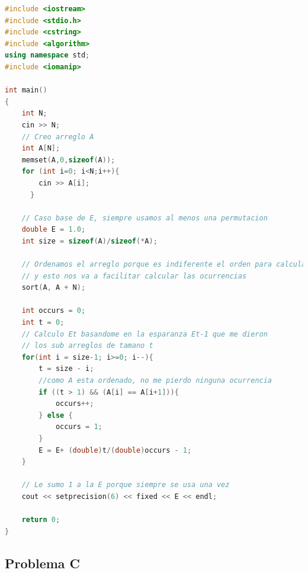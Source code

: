\documentclass[a4paper]{article}
\begin{document}
\begin{lstlisting}[language=c++]
#include <iostream>
#include <stdio.h>
#include <cstring>
#include <algorithm>
using namespace std;
#include <iomanip> 

int main()
{
    int N;
    cin >> N;
    // Creo arreglo A
    int A[N];
    memset(A,0,sizeof(A));
    for (int i=0; i<N;i++){
        cin >> A[i];
      }

    // Caso base de E, siempre usamos al menos una permutacion
    double E = 1.0;
    int size = sizeof(A)/sizeof(*A);
    
    // Ordenamos el arreglo porque es indiferente el orden para calcular E
	// y esto nos va a facilitar calcular las ocurrencias 
    sort(A, A + N);

    int occurs = 0;
    int t = 0;
    // Calculo Et basandome en la esparanza Et-1 que me dieron
    // los sub arreglos de tamano t
    for(int i = size-1; i>=0; i--){
    	t = size - i;
    	//como A esta ordenado, no me pierdo ninguna ocurrencia
    	if ((t > 1) && (A[i] == A[i+1])){
    		occurs++;
    	} else {
    		occurs = 1;
    	}
    	E = E+ (double)t/(double)occurs - 1;
    }
    
    // Le sumo 1 a la E porque siempre se usa una vez
    cout << setprecision(6) << fixed << E << endl;

    return 0;
}


\end{lstlisting}

\newpage
\subsection{Problema C}
\end{document}
